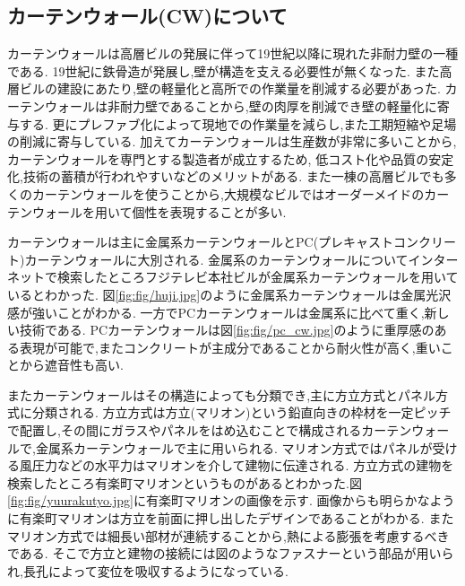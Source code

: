 \subsection*{カーテンウォール(CW)について}
カーテンウォールは高層ビルの発展に伴って19世紀以降に現れた非耐力壁の一種である.
19世紀に鉄骨造が発展し,壁が構造を支える必要性が無くなった.
また高層ビルの建設にあたり,壁の軽量化と高所での作業量を削減する必要があった.
カーテンウォールは非耐力壁であることから,壁の肉厚を削減でき壁の軽量化に寄与する.
更にプレファブ化によって現地での作業量を減らし,また工期短縮や足場の削減に寄与している.
加えてカーテンウォールは生産数が非常に多いことから,カーテンウォールを専門とする製造者が成立するため,
低コスト化や品質の安定化,技術の蓄積が行われやすいなどのメリットがある.
また一棟の高層ビルでも多くのカーテンウォールを使うことから,大規模なビルではオーダーメイドのカーテンウォールを用いて個性を表現することが多い.

カーテンウォールは主に金属系カーテンウォールとPC(プレキャストコンクリート)カーテンウォールに大別される.
金属系のカーテンウォールについてインターネットで検索したところフジテレビ本社ビルが金属系カーテンウォールを用いているとわかった.\cite{2008020675:online}
図\ref{fig:fig/huji.jpg}のように金属系カーテンウォールは金属光沢感が強いことがわかる.
一方でPCカーテンウォールは金属系に比べて重く,新しい技術である.
PCカーテンウォールは図\ref{fig:fig/pc_cw.jpg}のように重厚感のある表現が可能で,またコンクリートが主成分であることから耐火性が高く,重いことから遮音性も高い.

またカーテンウォールはその構造によっても分類でき,主に方立方式とパネル方式に分類される.
方立方式は方立(マリオン)という鉛直向きの枠材を一定ピッチで配置し,その間にガラスやパネルをはめ込むことで構成されるカーテンウォールで,金属系カーテンウォールで主に用いられる.
マリオン方式ではパネルが受ける風圧力などの水平力はマリオンを介して建物に伝達される.
方立方式の建物を検索したところ有楽町マリオンというものがあるとわかった.\cite{yuurakutyo59:online}図\ref{fig:fig/yuurakutyo.jpg}に有楽町マリオンの画像を示す.
画像からも明らかなように有楽町マリオンは方立を前面に押し出したデザインであることがわかる.
またマリオン方式では細長い部材が連続することから,熱による膨張を考慮するべきである.
そこで方立と建物の接続には図のようなファスナーという部品が用いられ,長孔によって変位を吸収するようになっている.

